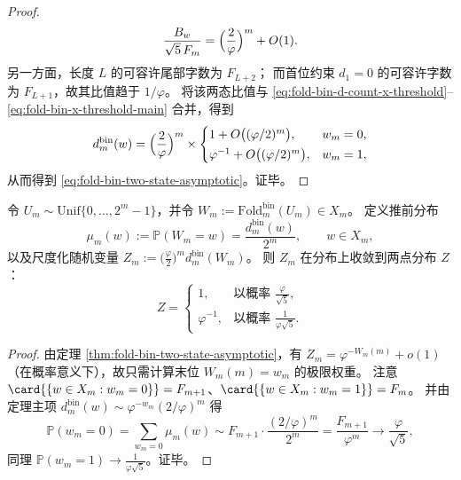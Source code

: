 \begin{proof}
\begin{equation}
\frac{B_w}{\sqrt5\,F_m}=\Bigl(\frac{2}{\varphi}\Bigr)^m+O(1).
\end{equation}
另一方面，长度 \(L\) 的可容许尾部字数为 \(F_{L+2}\)；
而首位约束 \(d_1=0\) 的可容许字数为 \(F_{L+1}\)，故其比值趋于 \(1/\varphi\)。
将该两态比值与 \eqref{eq:fold-bin-d-count-x-threshold}--\eqref{eq:fold-bin-x-threshold-main} 合并，得到
\[
d^{\mathrm{bin}}_m(w)
=\Bigl(\frac{2}{\varphi}\Bigr)^m\times
\begin{cases}
1+O\bigl((\varphi/2)^m\bigr),& w_m=0,\\[2pt]
\varphi^{-1}+O\bigl((\varphi/2)^m\bigr),& w_m=1,
\end{cases}
\]
从而得到 \eqref{eq:fold-bin-two-state-asymptotic}。证毕。
\end{proof}

\begin{corollary}\label{cor:fold-bin-two-point-limit-law}
令 \(U_m\sim\mathrm{Unif}\{0,\dots,2^m-1\}\)，并令 \(W_m:=\mathrm{Fold}^{\mathrm{bin}}_m(U_m)\in X_m\)。
定义推前分布
\[
\mu_m(w):=\mathbb{P}(W_m=w)=\frac{d^{\mathrm{bin}}_m(w)}{2^m},\qquad w\in X_m,
\]
以及尺度化随机变量
\(
Z_m:=\bigl(\frac{\varphi}{2}\bigr)^m d^{\mathrm{bin}}_m(W_m)
\)。
则 \(Z_m\) 在分布上收敛到两点分布 \(Z\)：
\[
Z=
\begin{cases}
1,& \text{以概率 }\displaystyle \frac{\varphi}{\sqrt5},\\[6pt]
\varphi^{-1},& \text{以概率 }\displaystyle \frac{1}{\varphi\sqrt5}.
\end{cases}
\]
\end{corollary}

\begin{proof}
由定理 \ref{thm:fold-bin-two-state-asymptotic}，有 \(Z_m=\varphi^{-W_m(m)}+o(1)\)（在概率意义下），故只需计算末位 \(W_m(m)=w_m\) 的极限权重。
注意 \(\card{\{w\in X_m:w_m=0\}}=F_{m+1}\)、\(\card{\{w\in X_m:w_m=1\}}=F_m\)。
并由定理主项 \(d^{\mathrm{bin}}_m(w)\sim \varphi^{-w_m}(2/\varphi)^m\) 得
\[
\mathbb{P}(w_m=0)
=\sum_{w_m=0}\mu_m(w)
\sim
F_{m+1}\cdot \frac{(2/\varphi)^m}{2^m}
=\frac{F_{m+1}}{\varphi^m}\to \frac{\varphi}{\sqrt5},
\]
同理 \(\mathbb{P}(w_m=1)\to \frac{1}{\varphi\sqrt5}\)。证毕。
\end{proof}

